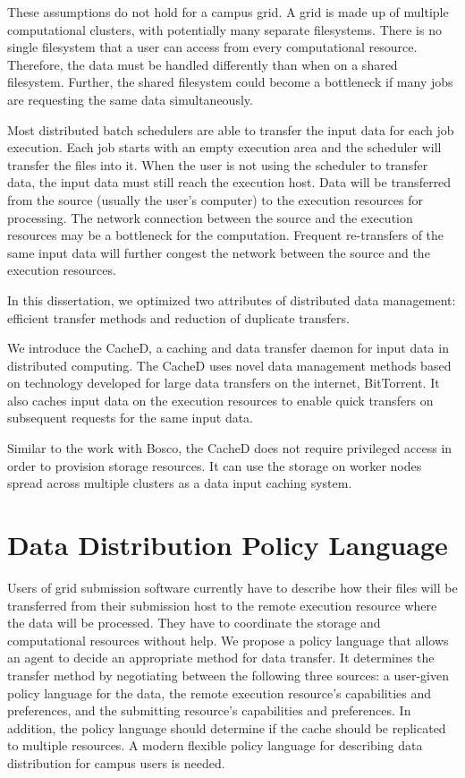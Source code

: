 These assumptions do not hold for a campus grid.  A grid is made up of multiple computational clusters, with potentially many separate filesystems.  There is no single filesystem that a user can access from every computational resource.  Therefore, the data must be handled differently than when on a shared filesystem.  Further, the shared filesystem could become a bottleneck if many jobs are requesting the same data simultaneously.


Most distributed batch schedulers are able to transfer the input data for each job execution.  Each job starts with an empty execution area and the scheduler will transfer the files into it.  When the user is not using the scheduler to transfer data, the input data must still reach the execution host.  Data will be transferred from the source (usually the user's computer) to the execution resources for processing.  The network connection between the source and the execution resources may be a bottleneck for the computation.  Frequent re-transfers of the same input data will further congest the network between the source and the execution resources.

In this dissertation, we optimized two attributes of distributed data management: efficient transfer methods and reduction of duplicate transfers.

We introduce the CacheD, a caching and data transfer daemon for input data in distributed computing.  The CacheD uses novel data management methods based on technology developed for large data transfers on the internet, BitTorrent.  It also caches input data on the execution resources to enable quick transfers on subsequent requests for the same input data.

Similar to the work with Bosco, the CacheD does not require privileged access in order to provision storage resources.  It can use the storage on worker nodes spread across multiple clusters as a data input caching system.

\section{Data Distribution Policy Language}

Users of grid submission software currently have to describe how their files will be transferred from their submission host to the remote execution resource where the data will be processed.  They have to coordinate the storage and computational resources without help.  We propose a policy language that allows an agent to decide an appropriate method for data transfer.  It determines the transfer method by negotiating between the following three sources: a user-given policy language for the data, the remote execution resource's capabilities and preferences, and the submitting resource's capabilities and preferences.  In addition, the policy language should determine if the cache should be replicated to multiple resources.  A modern flexible policy language for describing data distribution for campus users is needed.

